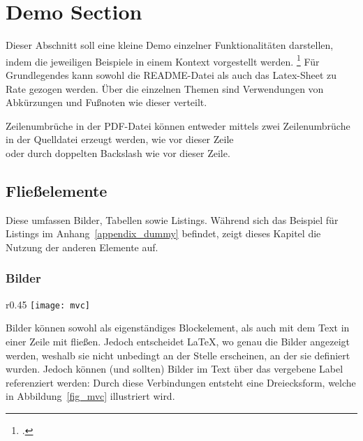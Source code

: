 \section{Demo Section}\label{demo}  

Dieser Abschnitt soll eine kleine Demo einzelner Funktionalitäten darstellen, indem die jeweiligen Beispiele in einem Kontext vorgestellt werden.
\footcite[An dieser Stelle soll erneut auf die Lizenz hingewiesen werden. Siehe][]{ccOJlizenz}
Für Grundlegendes kann sowohl die README-Datei als auch das Latex-Sheet zu Rate gezogen werden. 
Über die einzelnen Themen sind Verwendungen von Abkürzungen und Fußnoten wie dieser verteilt. 

Zeilenumbrüche in der PDF-Datei können entweder mittels zwei Zeilenumbrüche in der Quelldatei erzeugt werden, wie vor dieser Zeile\\
oder durch doppelten Backslash wie vor dieser Zeile.

\subsection{Fließelemente}
  Diese umfassen Bilder, Tabellen sowie Listings.
  Während sich das Beispiel für Listings im Anhang~\ref{appendix_dummy} befindet, zeigt dieses Kapitel die Nutzung der anderen Elemente auf.

 \subsubsection{Bilder}
    \begin{wrapfigure}{r}{0.45\linewidth}
      \vspace{-30pt}
      \centering
      \texttt{[image: mvc]}
      \caption[Aufbau von \acrlong{MVC}]{Aufbau von \gls{MVC}.\\Quelle: Angelehnt an \cite{curry2008flexible}}
      \label{fig_mvc}
    \end{wrapfigure}
    Bilder können sowohl als eigenständiges Blockelement, als auch mit dem Text in einer Zeile mit fließen.
    Jedoch entscheidet \LaTeX, wo genau die Bilder angezeigt werden, weshalb sie nicht unbedingt an der Stelle erscheinen,
    an der sie definiert wurden.
    Jedoch können (und sollten) Bilder im Text über das vergebene Label referenziert werden:
    Durch diese Verbindungen entsteht eine Dreiecksform, welche in Abbildung~\ref{fig_mvc} illustriert wird.

